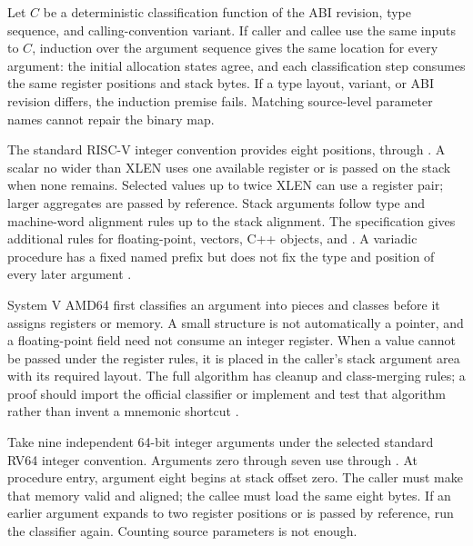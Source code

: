 \begin{proofkit}[title={Agreement by one deterministic classifier}]
Let \(C\) be a deterministic classification function of the ABI revision,
type sequence, and calling-convention variant. If caller and callee use the
same inputs to \(C\), induction over the argument sequence gives the same
location for every argument: the initial allocation states agree, and each
classification step consumes the same register positions and stack bytes.
If a type layout, variant, or ABI revision differs, the induction premise
fails. Matching source-level parameter names cannot repair the binary map.
\end{proofkit}

The standard RISC-V integer convention provides eight positions,
 through . A scalar no wider than XLEN uses one available
register or is passed on the stack when none remains. Selected values up to
twice XLEN can use a register pair; larger aggregates are passed by reference.
Stack arguments follow type and machine-word alignment rules up to the stack
alignment. The specification gives additional rules for floating-point,
vectors, C++ objects, and . A variadic procedure
has a fixed named prefix but does not fix the type and position of every later
argument \autocite{riscv2026abi}.

System V AMD64 first classifies an argument into pieces and classes before it
assigns registers or memory. A small structure is not automatically a pointer,
and a floating-point field need not consume an integer register. When a value
cannot be passed under the register rules, it is placed in the caller's stack
argument area with its required layout. The full algorithm has cleanup and
class-merging rules; a proof should import the official classifier or implement
and test that algorithm rather than invent a mnemonic shortcut
\autocite{sysv2023amd64abi}.

\begin{example}[title={The ninth RV64 integer argument crosses the boundary}]
Take nine independent 64-bit integer arguments under the selected standard
RV64 integer convention. Arguments zero through seven use  through
. At procedure entry, argument eight begins at stack offset zero.
The caller must make that memory valid and aligned; the callee must load the
same eight bytes. If an earlier argument expands to two register positions or
is passed by reference, run the classifier again. Counting source parameters
is not enough.
\end{example}

